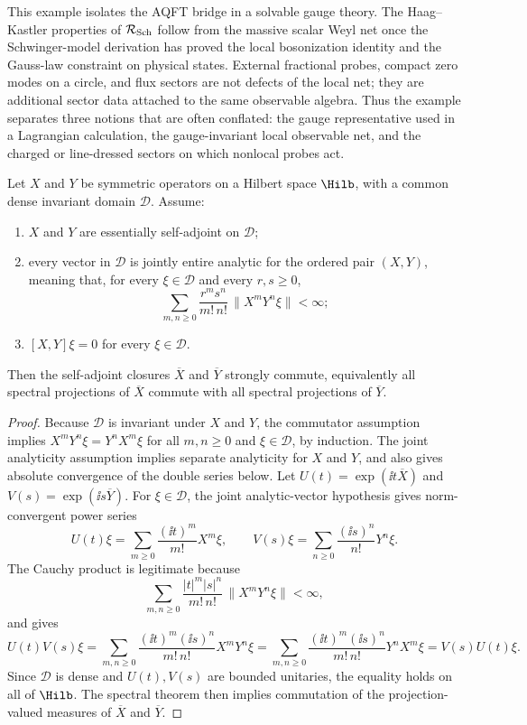 This example isolates the AQFT bridge in a solvable gauge theory.  The
Haag--Kastler properties of \(\mathcal R_{\rm Sch}\) follow from the massive
scalar Weyl net once the Schwinger-model derivation has proved the local
bosonization identity and the Gauss-law constraint on physical states.
External fractional probes, compact zero modes on a circle, and flux sectors
are not defects of the local net; they are additional sector data attached to
the same observable algebra.  Thus the example separates three notions that
are often conflated: the gauge representative used in a Lagrangian
calculation, the gauge-invariant local observable net, and the charged or
line-dressed sectors on which nonlocal probes act.

\begin{lemma}
\label{lem:analytic-vector-strong-locality}
Let \(X\) and \(Y\) be symmetric operators on a Hilbert space \(\Hilb\), with
a common dense invariant domain \(\mathcal D\).  Assume:
\begin{enumerate}[label=\textup{(\roman*)}]
\item \(X\) and \(Y\) are essentially self-adjoint on \(\mathcal D\);
\item every vector in \(\mathcal D\) is jointly entire analytic for the
ordered pair \((X,Y)\), meaning that, for every \(\xi\in\mathcal D\) and
every \(r,s\geq0\),
\[
  \sum_{m,n\geq0}\frac{r^m s^n}{m!\,n!}\,\|X^mY^n\xi\|<\infty ;
\]
\item \([X,Y]\xi=0\) for every \(\xi\in\mathcal D\).
\end{enumerate}
Then the self-adjoint closures \(\overline X\) and \(\overline Y\) strongly
commute, equivalently all spectral projections of \(\overline X\) commute with
all spectral projections of \(\overline Y\).
\end{lemma}

\begin{proof}
Because \(\mathcal D\) is invariant under \(X\) and \(Y\), the commutator
assumption implies \(X^mY^n\xi=Y^nX^m\xi\) for all \(m,n\geq 0\) and
\(\xi\in\mathcal D\), by induction.  The joint analyticity assumption implies
separate analyticity for \(X\) and \(Y\), and also gives absolute convergence
of the double series below.  Let \(U(t)=\exp(\ii t\overline X)\) and
\(V(s)=\exp(\ii s\overline Y)\).  For \(\xi\in\mathcal D\), the joint
analytic-vector hypothesis gives norm-convergent power series
\[
  U(t)\xi=\sum_{m\geq0}\frac{(\ii t)^m}{m!}X^m\xi,\qquad
  V(s)\xi=\sum_{n\geq0}\frac{(\ii s)^n}{n!}Y^n\xi .
\]
The Cauchy product is legitimate because
\[
  \sum_{m,n\geq0}
  \frac{|t|^m|s|^n}{m!\,n!}\,\|X^mY^n\xi\|<\infty ,
\]
and gives
\[
  U(t)V(s)\xi
  =
  \sum_{m,n\geq0}\frac{(\ii t)^m(\ii s)^n}{m!\,n!}X^mY^n\xi
  =
  \sum_{m,n\geq0}\frac{(\ii t)^m(\ii s)^n}{m!\,n!}Y^nX^m\xi
  =
  V(s)U(t)\xi .
\]
Since \(\mathcal D\) is dense and \(U(t),V(s)\) are bounded unitaries, the
equality holds on all of \(\Hilb\).  The spectral theorem then implies
commutation of the projection-valued measures of \(\overline X\) and
\(\overline Y\).
\end{proof}

